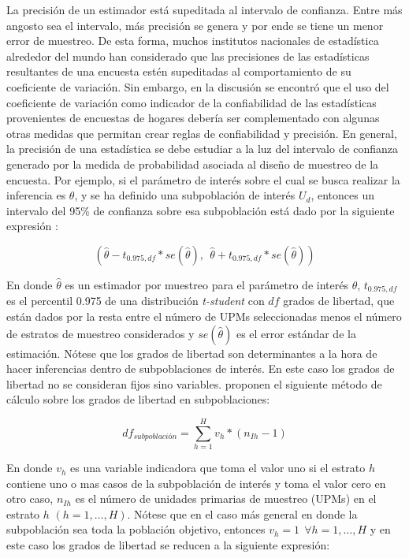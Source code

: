 \documentclass[12pt,spanish,]{book}
\begin{document}
La precisión de un estimador está supeditada al intervalo de confianza. Entre más angosto sea el intervalo, más precisión se genera y por ende se tiene un menor error de muestreo.
De esta forma, muchos institutos nacionales de estadística alrededor del mundo han considerado que las precisiones de las estadísticas resultantes de una encuesta estén supeditadas al comportamiento de su coeficiente de variación.
Sin embargo, en la discusión se encontró que el uso del coeficiente de variación como indicador de la confiabilidad de las estadísticas provenientes de encuestas de hogares debería ser complementado con algunas otras medidas que permitan crear reglas de confiabilidad y precisión. En general, la precisión de una estadística se debe estudiar a la luz del intervalo de confianza generado por la medida de probabilidad asociada al diseño de muestreo de la encuesta. Por ejemplo, si el parámetro de interés sobre el cual se busca realizar la inferencia es \(\theta\), y se ha definido una subpoblación de interés \(U_d\), entonces un intervalo del 95\% de confianza sobre esa subpoblación está dado por la siguiente expresión \autocite{Heeringa_West_Berglund_2010}:

\[
(\hat\theta - t_{0.975, df} * se(\hat\theta), \ \ \hat\theta + t_{0.975, df} * se(\hat\theta))
\]

En donde \(\hat\theta\) es un estimador por muestreo para el parámetro de interés \(\theta\), \(t_{0.975, df}\) es el percentil 0.975 de una distribución \emph{t-student} con \(df\) grados de libertad, que están dados por la resta entre el número de UPMs seleccionadas menos el número de estratos de muestreo considerados y \(se(\hat\theta)\) es el error estándar de la estimación. Nótese que los grados de libertad son determinantes a la hora de hacer inferencias dentro de subpoblaciones de interés. En este caso los grados de libertad no se consideran fijos sino variables. \textcite{Korn_Graubard_1999} proponen el siguiente método de cálculo sobre los grados de libertad en subpoblaciones:

\[
df_{subpoblación} = \sum_{h=1}^H v_h*(n_{Ih} - 1)
\]

En donde \(v_h\) es una variable indicadora que toma el valor uno si el estrato \(h\) contiene uno o mas casos de la subpoblación de interés y toma el valor cero en otro caso, \(n_{Ih}\) es el número de unidades primarias de muestreo (UPMs) en el estrato \(h\) \((h=1, \ldots, H)\). Nótese que en el caso más general en donde la subpoblación sea toda la población objetivo, entonces \(v_h = 1 \ \ \forall h=1, \ldots, H\) y en este caso los grados de libertad se reducen a la siguiente expresión:
\end{document}
